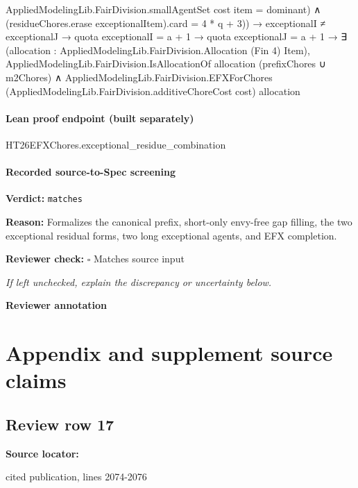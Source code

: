 \documentclass[10pt]{article}
\newcommand{\reviewerbox}{%
  \par\noindent\fbox{\parbox{0.96\linewidth}{\rule{0pt}{0.38in}}}\par
}
\newcommand{\reviewmatch}[1]{%
  \par\noindent\textbf{Reviewer check:} $\square$\; #1\par
  \noindent\emph{If left unchecked, explain the discrepancy or uncertainty below.}\par
}
\begin{document}
\begin{ReviewVerbatim}
                                                    AppliedModelingLib.FairDivision.smallAgentSet cost item =
                                                      dominant) ∧
                                                  (residueChores.erase exceptionalItem).card = 4 * q + 3)) →
                              exceptionalI ≠ exceptionalJ →
                                quota exceptionalI = a + 1 →
                                  quota exceptionalJ = a + 1 →
                                    ∃ (allocation : AppliedModelingLib.FairDivision.Allocation (Fin 4) Item),
                                      AppliedModelingLib.FairDivision.IsAllocationOf allocation
                                          (prefixChores ∪ m2Chores) ∧
                                        AppliedModelingLib.FairDivision.EFXForChores
                                          (AppliedModelingLib.FairDivision.additiveChoreCost cost) allocation
\end{ReviewVerbatim}



\paragraph{Lean proof endpoint (built separately)}\begin{ReviewVerbatim}
HT26EFXChores.exceptional_residue_combination
\end{ReviewVerbatim}

\paragraph{Recorded source-to-Spec screening}
\textbf{Verdict:} \texttt{matches}
\\
{\raggedright
\textbf{Reason:} Formalizes the canonical prefix, short-\allowbreak{}only envy-\allowbreak{}free gap filling, the two exceptional residual forms, two long exceptional agents, and EFX completion.\allowbreak{}
\par}
\reviewmatch{Matches source input}
\noindent\textbf{Reviewer annotation}\par
\reviewerbox
\clearpage
\hypertarget{source-claim-bf31a0d3fb856868}{}
\hypertarget{source-section-1743f0a28d68d6cc}{}
\section*{Appendix and supplement source claims}
\subsection*{Review row 17}
\textbf{Source locator:} {\footnotesize\raggedright cited publication, lines 2074-\allowbreak{}2076\par}
\end{document}
